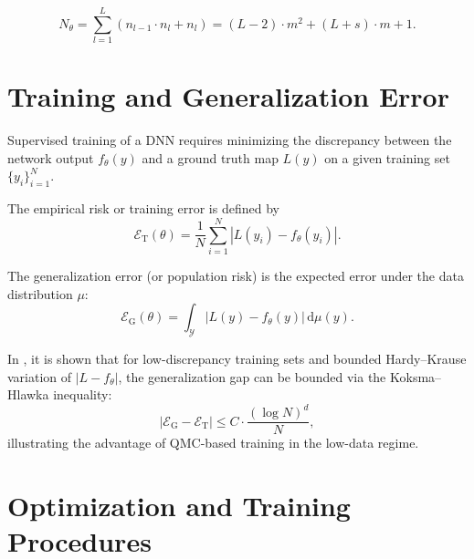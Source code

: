 \begin{equation*}
    N_\theta = \sum_{l=1}^{L} (n_{l-1} \cdot n_l + n_l) = (L-2) \cdot m^2 + (L+s) \cdot m + 1.
\end{equation*}


\section{Training and Generalization Error}
\label{sec:dnn-error}

Supervised training of a DNN requires minimizing the discrepancy between the
network output $f_\theta(y)$ and a ground truth map $L(y)$ on a given training
set $\{y_i\}_{i=1}^N$.

\begin{definition}
The empirical risk or training error is defined by
 \begin{equation*}
\mathcal{E}_\mathrm{T}(\theta) = \frac{1}{N} \sum_{i=1}^N |L(y_i) - f_\theta(y_i)|.
 \end{equation*}
\end{definition}

\begin{definition}
The generalization error (or population risk) is the expected error under the
data distribution $\mu$:
 \begin{equation*}
\mathcal{E}_\mathrm{G}(\theta) = \int_{\mathcal{Y}} |L(y) - f_\theta(y)| \, \mathrm{d}\mu(y).
 \end{equation*}
\end{definition}

\begin{remark}
In \cite{mishra1}, it is shown that for low-discrepancy training sets and
bounded Hardy--Krause variation of $|L - f_\theta|$, the generalization gap can
be bounded via the Koksma--Hlawka inequality:
 \begin{equation*}
\left| \mathcal{E}_\mathrm{G} - \mathcal{E}_\mathrm{T} \right| \leq C \cdot \frac{(\log N)^d}{N},
 \end{equation*}
illustrating the advantage of QMC-based training in the low-data regime.
\end{remark}


\section{Optimization and Training Procedures}
\label{sec:dnn-training}

